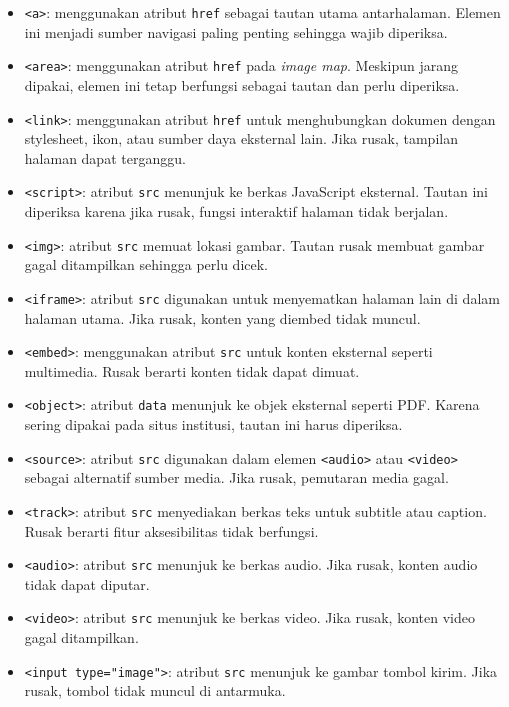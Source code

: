 \begin{itemize}
  \item \texttt{<a>}: menggunakan atribut \texttt{href} sebagai tautan utama antarhalaman. Elemen ini menjadi sumber navigasi paling penting sehingga wajib diperiksa.
  \item \texttt{<area>}: menggunakan atribut \texttt{href} pada \textit{image map}. Meskipun jarang dipakai, elemen ini tetap berfungsi sebagai tautan dan perlu diperiksa.
  \item \texttt{<link>}: menggunakan atribut \texttt{href} untuk menghubungkan dokumen dengan stylesheet, ikon, atau sumber daya eksternal lain. Jika rusak, tampilan halaman dapat terganggu.
  \item \texttt{<script>}: atribut \texttt{src} menunjuk ke berkas JavaScript eksternal. Tautan ini diperiksa karena jika rusak, fungsi interaktif halaman tidak berjalan.
  \item \texttt{<img>}: atribut \texttt{src} memuat lokasi gambar. Tautan rusak membuat gambar gagal ditampilkan sehingga perlu dicek.
  \item \texttt{<iframe>}: atribut \texttt{src} digunakan untuk menyematkan halaman lain di dalam halaman utama. Jika rusak, konten yang diembed tidak muncul.
  \item \texttt{<embed>}: menggunakan atribut \texttt{src} untuk konten eksternal seperti multimedia. Rusak berarti konten tidak dapat dimuat.
  \item \texttt{<object>}: atribut \texttt{data} menunjuk ke objek eksternal seperti PDF. Karena sering dipakai pada situs institusi, tautan ini harus diperiksa.
  \item \texttt{<source>}: atribut \texttt{src} digunakan dalam elemen \texttt{<audio>} atau \texttt{<video>} sebagai alternatif sumber media. Jika rusak, pemutaran media gagal.
  \item \texttt{<track>}: atribut \texttt{src} menyediakan berkas teks untuk subtitle atau caption. Rusak berarti fitur aksesibilitas tidak berfungsi.
  \item \texttt{<audio>}: atribut \texttt{src} menunjuk ke berkas audio. Jika rusak, konten audio tidak dapat diputar.
  \item \texttt{<video>}: atribut \texttt{src} menunjuk ke berkas video. Jika rusak, konten video gagal ditampilkan.
  \item \texttt{<input type="image">}: atribut \texttt{src} menunjuk ke gambar tombol kirim. Jika rusak, tombol tidak muncul di antarmuka.
\end{itemize}
